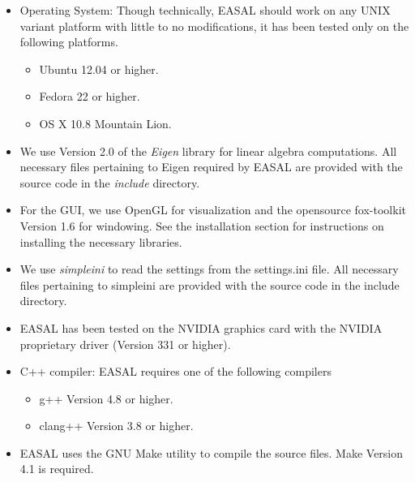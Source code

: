 \documentclass[10pt]{article}
\begin{document}
\begin{itemize} 
  \item Operating System: Though technically, EASAL should work on any UNIX variant platform with little to no modifications, it has been tested only on  the following platforms. 
  \begin{itemize}
	\item Ubuntu 12.04 or higher.
	\item Fedora 22 or higher.
	\item OS X 10.8 Mountain Lion.
\end{itemize}
\item We use Version 2.0 of the \emph{Eigen} library for linear algebra
computations. All necessary files pertaining to Eigen required by
EASAL are provided with the source code in the \emph{include}
directory.  
   
\item For the GUI, we use OpenGL for visualization and the
opensource fox-toolkit Version 1.6 for windowing. See the
installation section for instructions on installing the necessary
libraries.  
		  
\item We use \emph{simpleini} to read the settings from the
settings.ini file. All necessary files pertaining to simpleini are
provided with the source code in the include directory.

\item EASAL has been tested on the NVIDIA graphics card with the NVIDIA
proprietary driver (Version 331 or higher).

\item C++ compiler: EASAL requires one of the following compilers
\begin{itemize}
\item g++ Version 4.8 or higher.
\item clang++ Version 3.8 or higher.
\end{itemize}
		  
\item EASAL uses the GNU Make utility to compile the source files. Make
Version 4.1 is required.
\end{itemize}

 
\end{document}
